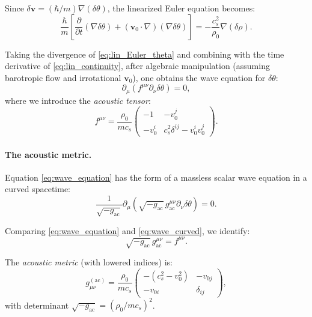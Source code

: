 Since $\delta\mathbf{v} = (\hbar/m)\nabla(\delta\theta)$, the linearized Euler equation becomes:
\begin{equation}
\label{eq:lin_Euler_theta}
\frac{\hbar}{m} \left[ \frac{\partial}{\partial t}(\nabla \delta\theta) + (\mathbf{v}_0 \cdot \nabla)(\nabla \delta\theta) \right] = -\frac{c_s^2}{\rho_0} \nabla(\delta\rho).
\end{equation}

Taking the divergence of \eqref{eq:lin_Euler_theta} and combining with the time derivative of \eqref{eq:lin_continuity}, after algebraic manipulation (assuming barotropic flow and irrotational $\mathbf{v}_0$), one obtains the wave equation for $\delta\theta$:
\begin{equation}
\label{eq:wave_equation}
\boxed{\partial_\mu \left( f^{\mu\nu} \partial_\nu \delta\theta \right) = 0,}
\end{equation}
where we introduce the \emph{acoustic tensor}:
\begin{equation}
\label{eq:acoustic_tensor}
f^{\mu\nu} = \frac{\rho_0}{m c_s}
\begin{pmatrix}
-1 & -v_0^j \\
-v_0^i & c_s^2 \delta^{ij} - v_0^i v_0^j
\end{pmatrix}.
\end{equation}

\paragraph{The acoustic metric.}
Equation \eqref{eq:wave_equation} has the form of a massless scalar wave equation in a curved spacetime:
\begin{equation}
\label{eq:wave_curved}
\frac{1}{\sqrt{-g_{\mathrm{ac}}}} \partial_\mu \left( \sqrt{-g_{\mathrm{ac}}} \, g_{\mathrm{ac}}^{\mu\nu} \partial_\nu \delta\theta \right) = 0.
\end{equation}

Comparing \eqref{eq:wave_equation} and \eqref{eq:wave_curved}, we identify:
\begin{equation}
\sqrt{-g_{\mathrm{ac}}} \, g_{\mathrm{ac}}^{\mu\nu} = f^{\mu\nu}.
\end{equation}

The \emph{acoustic metric} (with lowered indices) is:
\begin{equation}
\label{eq:acoustic_metric}
\boxed{g_{\mu\nu}^{\mathrm{(ac)}} = \frac{\rho_0}{m c_s}
\begin{pmatrix}
-(c_s^2 - v_0^2) & -v_{0j} \\
-v_{0i} & \delta_{ij}
\end{pmatrix},}
\end{equation}
with determinant $\sqrt{-g_{\mathrm{ac}}} = (\rho_0/mc_s)^2$.

